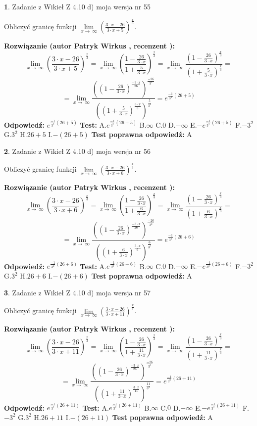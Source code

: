 \documentclass[12pt, a4paper]{article}
\theoremstyle{definition} %
\newtheorem{zad}{}
\newcommand{\zadStart}[1]{\begin{zad}#1\newline}
\newcommand{\zadStop}{\end{zad}}
\newcommand{\rozwStart}[2]{\noindent \textbf{Rozwiązanie (autor #1 , recenzent #2): }\newline}
\newcommand{\rozwStop}{\newline}
\newcommand{\odpStart}{\noindent \textbf{Odpowiedź:}\newline}
\newcommand{\odpStop}{\newline}
\newcommand{\testStart}{\noindent \textbf{Test:}\newline}
\newcommand{\testStop}{\newline}
\newcommand{\kluczStart}{\noindent \textbf{Test poprawna odpowiedź:}\newline}
\newcommand{\kluczStop}{\newline}
\begin{document}
\zadStart{Zadanie z Wikieł Z 4.10 d) moja wersja nr 55}


Obliczyć granicę funkcji  $\lim\limits_{x\to\ \infty}(\frac{3\cdot x-26}{3\cdot x+5})^{\frac{x}{3}}$.
\zadStop
\rozwStart{Patryk Wirkus}{}
$$\lim\limits_{x\to\ \infty}(\frac{3\cdot x-26}{3\cdot x+5})^{\frac{x}{3}} = \lim\limits_{x\to\ \infty}(\frac{1-\frac{26}{3\cdot x}}{1+\frac{5}{3\cdot x}})^{\frac{x}{3}}=\lim\limits_{x\to\ \infty}\frac{(1-\frac{26}{3\cdot x})^{\frac{x}{3}}}{(1+\frac{5}{3\cdot x})^{\frac{x}{3}}}=$$
$$=\lim\limits_{x\to\ \infty}\frac{((1-\frac{26}{3\cdot x})^{\frac{-3\cdot x}{26}})^{\frac{-26}{3^{2}}}}{((1+\frac{5}{3\cdot x})^{\frac{3\cdot x}{5}})^{\frac{5}{3^{2}}}}=e^{\frac{-1}{3^{2}}(26+5)}$$
\rozwStop
\odpStart
$e^{\frac{-1}{3^{2}}(26+5)}$
\odpStop
\testStart
A.$e^{\frac{-1}{3^{2}}(26+5)}$ B.$\infty$ C.$0$ D.$-\infty$ E.$-e^{\frac{-1}{3^{2}}(26+5)}$
F.$-3^{2}$ G.$3^{2}$
H.$26+5$
I.$-(26+5)$
\testStop
\kluczStart
A
\kluczStop



\zadStart{Zadanie z Wikieł Z 4.10 d) moja wersja nr 56}


Obliczyć granicę funkcji  $\lim\limits_{x\to\ \infty}(\frac{3\cdot x-26}{3\cdot x+6})^{\frac{x}{3}}$.
\zadStop
\rozwStart{Patryk Wirkus}{}
$$\lim\limits_{x\to\ \infty}(\frac{3\cdot x-26}{3\cdot x+6})^{\frac{x}{3}} = \lim\limits_{x\to\ \infty}(\frac{1-\frac{26}{3\cdot x}}{1+\frac{6}{3\cdot x}})^{\frac{x}{3}}=\lim\limits_{x\to\ \infty}\frac{(1-\frac{26}{3\cdot x})^{\frac{x}{3}}}{(1+\frac{6}{3\cdot x})^{\frac{x}{3}}}=$$
$$=\lim\limits_{x\to\ \infty}\frac{((1-\frac{26}{3\cdot x})^{\frac{-3\cdot x}{26}})^{\frac{-26}{3^{2}}}}{((1+\frac{6}{3\cdot x})^{\frac{3\cdot x}{6}})^{\frac{6}{3^{2}}}}=e^{\frac{-1}{3^{2}}(26+6)}$$
\rozwStop
\odpStart
$e^{\frac{-1}{3^{2}}(26+6)}$
\odpStop
\testStart
A.$e^{\frac{-1}{3^{2}}(26+6)}$ B.$\infty$ C.$0$ D.$-\infty$ E.$-e^{\frac{-1}{3^{2}}(26+6)}$
F.$-3^{2}$ G.$3^{2}$
H.$26+6$
I.$-(26+6)$
\testStop
\kluczStart
A
\kluczStop



\zadStart{Zadanie z Wikieł Z 4.10 d) moja wersja nr 57}


Obliczyć granicę funkcji  $\lim\limits_{x\to\ \infty}(\frac{3\cdot x-26}{3\cdot x+11})^{\frac{x}{3}}$.
\zadStop
\rozwStart{Patryk Wirkus}{}
$$\lim\limits_{x\to\ \infty}(\frac{3\cdot x-26}{3\cdot x+11})^{\frac{x}{3}} = \lim\limits_{x\to\ \infty}(\frac{1-\frac{26}{3\cdot x}}{1+\frac{11}{3\cdot x}})^{\frac{x}{3}}=\lim\limits_{x\to\ \infty}\frac{(1-\frac{26}{3\cdot x})^{\frac{x}{3}}}{(1+\frac{11}{3\cdot x})^{\frac{x}{3}}}=$$
$$=\lim\limits_{x\to\ \infty}\frac{((1-\frac{26}{3\cdot x})^{\frac{-3\cdot x}{26}})^{\frac{-26}{3^{2}}}}{((1+\frac{11}{3\cdot x})^{\frac{3\cdot x}{11}})^{\frac{11}{3^{2}}}}=e^{\frac{-1}{3^{2}}(26+11)}$$
\rozwStop
\odpStart
$e^{\frac{-1}{3^{2}}(26+11)}$
\odpStop
\testStart
A.$e^{\frac{-1}{3^{2}}(26+11)}$ B.$\infty$ C.$0$ D.$-\infty$ E.$-e^{\frac{-1}{3^{2}}(26+11)}$
F.$-3^{2}$ G.$3^{2}$
H.$26+11$
I.$-(26+11)$
\testStop
\kluczStart
A
\kluczStop
\end{document}
